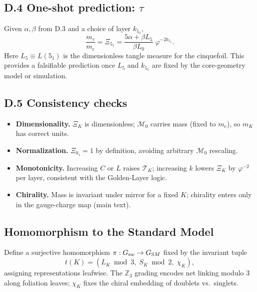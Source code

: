\documentclass[smallextended]{svjour3}       %
\begin{document}
		\subsection*{D.4 One-shot prediction: \texorpdfstring{\(\tau\)}{tau}}
		Given \(\alpha,\beta\) from D.3 and a choice of layer \(k_{5_1}\),
		\[
		\frac{m_\tau}{m_e}
		= \Xi_{5_1}
		= \frac{5\alpha+\beta L_5}{\beta L_0}\;\varphi^{-2k_{5_1}}.
		\]
		Here \(L_5\equiv L(5_1)\) is the dimensionless tangle measure for the cinquefoil.
		This provides a falsifiable prediction once \(L_5\) and \(k_{5_1}\) are fixed by the core-geometry model or simulation.

		\subsection*{D.5 Consistency checks}
		\begin{itemize}
		\item \textbf{Dimensionality.} \(\Xi_K\) is dimensionless; \(\mathcal{M}_0\) carries mass (fixed to \(m_e\)), so \(m_K\) has correct units.
		\item \textbf{Normalization.} \(\Xi_{0_1}=1\) by definition, avoiding arbitrary \(\mathcal{M}_0\) rescaling.
		\item \textbf{Monotonicity.} Increasing \(C\) or \(L\) raises \(\mathcal{T}_K\); increasing \(k\) lowers \(\Xi_K\) by \(\varphi^{-2}\) per layer, consistent with the Golden-Layer logic.
		\item \textbf{Chirality.} Mass is invariant under mirror for a fixed \(K\); chirality enters only in the gauge-charge map (main text).
		\end{itemize}

		\subsection{Homomorphism to the Standard Model}
		Define a surjective homomorphism \(\pi:G_{\textrm sw}\to G_{\textrm SM}\) fixed by the invariant tuple
		\begin{equation}
		t(K)=(L_K\bmod 3,\; S_K\bmod 2,\; \chi_K),
		\end{equation}
		assigning representations leafwise. The \(\mathbb Z_3\) grading encodes net linking modulo 3 along foliation leaves; \(\chi_K\) fixes the chiral embedding of doublets vs.\ singlets.

\end{document}
